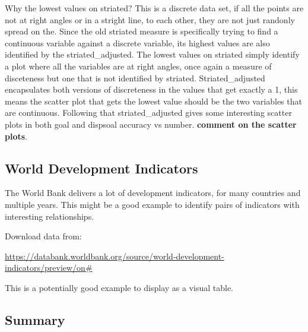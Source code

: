 Why the lowest values on striated? This is a discrete data set, if all
the points are not at right angles or in a stright line, to each other,
they are not just randonly spread on the. Since the old striated measure
is specifically trying to find a continuous variable against a discrete
variable, its highest values are also identified by the
striated\_adjusted. The lowest values on striated simply identify a plot
where all the variables are at right angles, once again a measure of
disceteness but one that is not identified by striated.
Striated\_adjusted encapsulates both versions of discreteness in the
values that get exactly a 1, this means the scatter plot that gets the
lowest value should be the two variables that are continuous. Following
that striated\_adjusted gives some interesting scatter plots in both
goal and dispsoal accuracy vs number. \textbf{comment on the scatter
plots}.

\hypertarget{world-development-indicators}{%
\subsection{World Development
Indicators}\label{world-development-indicators}}

The World Bank delivers a lot of development indicators, for many
countries and multiple years. This might be a good example to identify
pairs of indicators with interesting relationships.

Download data from:

\url{https://databank.worldbank.org/source/world-development-indicators/preview/on\#}

This is a potentially good example to display as a visual table.

\hypertarget{summary}{%
\subsection{Summary}\label{summary}}

\begin{verbatim}
\end{verbatim}



\address{%
Harriet Mason\\
Monash University\\%
Department of Econometrics and Business Statistics\\ Melbourne,
Australia\\
%
\url{https://www.britannica.com/animal/quokka}\\%
\textit{ORCiD: \href{https://orcid.org/0000-1721-1511-1101}{0000-1721-1511-1101}}\\%
\href{mailto:hmas0003@student.monash.edu}{\nolinkurl{hmas0003@student.monash.edu}}%
}

